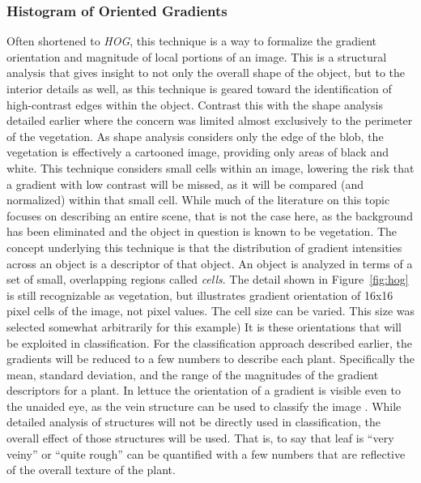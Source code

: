 \documentclass[letterpaper]{report}
\begin{document}
\subsubsection{Histogram of Oriented Gradients}
Often shortened to \textit{HOG}, this technique is a way to formalize the gradient orientation and magnitude of local portions of an image\parencite[p.~155]{Forsyth2012-hy}. This is a structural analysis that gives insight to not only the overall shape of the object, but to the interior details as well, as this technique is geared toward the identification of high-contrast edges within the object. Contrast this with the shape analysis detailed earlier where the concern was limited almost exclusively to the perimeter of the vegetation.  As shape analysis considers only the edge of the blob, the vegetation is effectively a cartooned image, providing only areas of black and white. This technique considers small cells within an image, lowering the risk that a gradient with low contrast will be missed, as it will be compared (and normalized) within that small cell. While much of the literature on this topic focuses on describing an entire scene, that is not the case here, as the background has been eliminated and the object in question is known to be vegetation. The concept underlying this technique is that the distribution of gradient intensities across an object is a descriptor of that object. An object is analyzed in terms of a set of small, overlapping regions called \textit{cells}.
The detail shown in Figure~\ref{fig:hog} is still recognizable as vegetation, but illustrates gradient orientation of 16x16 pixel cells of the image, not pixel values. The cell size can be varied. This size was selected somewhat arbitrarily for this example) It is these orientations that will be exploited in classification.  For the classification approach described earlier, the gradients will be reduced to a few numbers to describe each plant. Specifically the mean, standard deviation, and the range of the magnitudes of the gradient descriptors for a plant. In lettuce the orientation of a gradient is visible even to the unaided eye, as the vein structure can be used to classify the image \parencite{Elhariri2014-eo}. While detailed analysis of structures will not be directly used in classification, the overall effect of those structures will be used. That is, to say that leaf is ``very veiny'' or ``quite rough'' can be quantified with a few numbers that are reflective of the overall texture of the plant.
\end{document}
